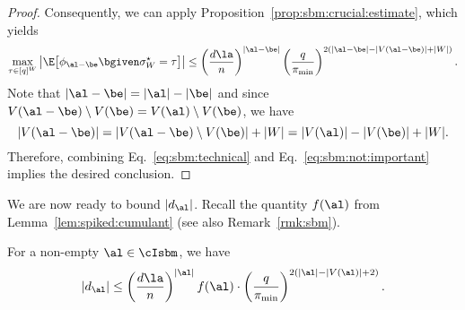 \documentclass[11pt]{article}
\begin{document}
\begin{proof}
Consequently, we can apply Proposition~\ref{prop:sbm:crucial:estimate}, which yields
\begin{equation}\label{eq:sbm:not:important}
\max_{\tau\in [q]^W}\big|\E\big[\phi_{\al-\be}\bgiven \sigma^\star_{W}=\tau\big]\big|\leq \left(\frac{d\la}{n}\right)^{|\al-\be|}  \left(\frac{q}{\pi_{\min}}\right)^{2(|\al-\be|-|V(\al-\be)|+|W|)}.
\end{equation}
Note that $|\al-\be|=|\al|-|\be|$ and since $V(\al-\be)\setminus V(\be)=V(\al)\setminus V(\be)$, we have 
\[
|V(\al-\be)|=|V(\al-\be)\setminus V(\be)|+|W|=|V(\al)|-|V(\be)|+|W|.
\]
Therefore, combining Eq.~\eqref{eq:sbm:technical} and Eq.~\eqref{eq:sbm:not:important} implies the desired conclusion.
\end{proof}
\noindent We are now ready to bound $|d_{\al}|$. Recall the quantity $f(\al)$ from Lemma~\ref{lem:spiked:cumulant} (see also Remark~\ref{rmk:sbm}).
\begin{lemma}\label{lem:sbm:d:alpha}
    For a non-empty $\al\in \cIsbm$, we have
    \[
    |d_{\al}|\leq \left(\frac{d\la}{n}\right)^{|\al|}f(\al) \cdot \left(\frac{q}{\pi_{\min}}\right)^{2(|\al|-|V(\al)|+2)}.
    \]
\end{lemma}
\end{document}
